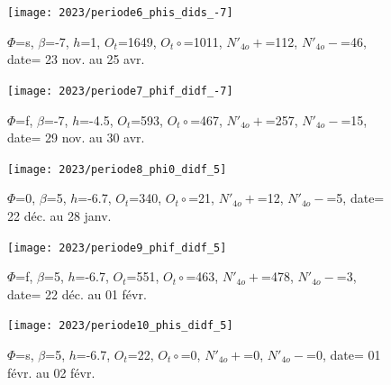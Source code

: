 \documentclass[11pt,twocolumn,titlepage,twoside]{article}
\begin{document}
\begin{figure}[htbp]
        \centering
        \texttt{[image: 2023/periode6\_phis\_dids\_-7]}
        \caption{
                $\Phi$=s, 
                $\beta$=-7, 
                $h$=1, 
                $O_t$=1649, 
                $O_t\circ$=1011,
                $N'_{4o}+$=112, 
                $N'_{4o}-$=46,
                date= 23 nov. au 25 avr.               
               }
                \label{periode11}
\end{figure}


\begin{figure}[htbp]
        \centering
        \texttt{[image: 2023/periode7\_phif\_didf\_-7]}
        \caption{
                $\Phi$=f, 
                $\beta$=-7, 
                $h$=-4.5, 
                $O_t$=593, 
                $O_t\circ$=467,
                $N'_{4o}+$=257, 
                $N'_{4o}-$=15,
                date= 29 nov. au 30 avr.               
               }
                \label{periode11}
\end{figure}


\begin{figure}[htbp]
        \centering
        \texttt{[image: 2023/periode8\_phi0\_didf\_5]}
        \caption{
                $\Phi$=0, 
                $\beta$=5, 
                $h$=-6.7, 
                $O_t$=340, 
                $O_t\circ$=21,
                $N'_{4o}+$=12, 
                $N'_{4o}-$=5,
                date= 22 déc. au 28 janv.               
               }
                \label{periode11}
\end{figure}


\begin{figure}[htbp]
        \centering
        \texttt{[image: 2023/periode9\_phif\_didf\_5]}
        \caption{
                $\Phi$=f, 
                $\beta$=5, 
                $h$=-6.7, 
                $O_t$=551, 
                $O_t\circ$=463,
                $N'_{4o}+$=478, 
                $N'_{4o}-$=3,
                date= 22 déc. au 01 févr.               
               }
                \label{periode11}
\end{figure}


\begin{figure}[htbp]
        \centering
        \texttt{[image: 2023/periode10\_phis\_didf\_5]}
        \caption{
                $\Phi$=s, 
                $\beta$=5, 
                $h$=-6.7, 
                $O_t$=22, 
                $O_t\circ$=0,
                $N'_{4o}+$=0, 
                $N'_{4o}-$=0,
                date= 01 févr. au 02 févr.               
               }
                \label{periode11}
\end{figure}
\end{document}
